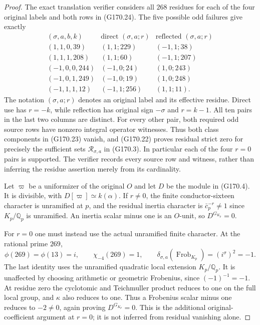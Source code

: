 \begin{proof}
The exact translation verifier considers all $268$ residues
for each of the four original labels and both rows in
(G170.24).  The five possible odd failures give exactly
\[
 \begin{array}{c|c|c}
 (\sigma,a,b,k)&\text{direct }(\sigma,a;r)&\text{reflected }(\sigma,a;r)\\ \hline
 (1,1,0,39)&(1,1;229)&(-1,1;38)\\
 (1,1,1,208)&(1,1;60)&(-1,1;207)\\
 (-1,0,0,244)&(-1,0;24)&(1,0;243)\\
 (-1,0,1,249)&(-1,0;19)&(1,0;248)\\
 (-1,1,1,12)&(-1,1;256)&(1,1;11).
 \end{array}
 \tag{G170.25}
\]
The notation $(\sigma,a;r)$ denotes an original label and
its effective residue.  Direct use has $r=-k$, while reflection
has original sign $-\sigma$ and $r=k-1$.
All ten pairs in the last two columns are distinct.
For every other pair, both required odd source rows have
nonzero integral operator witnesses.  Thus both class
components in (G170.23) vanish, and (G170.22) proves
residual strict zero for precisely the sufficient sets
$\mathcal R_{\sigma,a}$ in (G170.3).
In particular each of the four $r=0$ pairs is supported.
The verifier records every source row and witness, rather
than inferring the residue assertion merely from its cardinality.

Let $\varpi$ be a uniformizer of the original $O$ and let $D$
be the module in (G170.4).
It is divisible, with $D[\varpi]\simeq k(\alpha)$.
If $r\ne0$, the finite conductor-sixteen character is
unramified at $p$, and the residual inertia character is
$\bar c_p^{-r}\ne1$ since $K_p/\mathbb Q_p$ is unramified.
An inertia scalar minus one is an $O$-unit, so
$D^{G_{K_p}}=0$.

For $r=0$ one must instead use the actual unramified finite
character.  At the rational prime $269$,
\[
 \phi(269)=\phi(13)=i,
 \qquad \chi_{-4}(269)=1,
 \qquad \delta_{\sigma,a}(\operatorname{Frob}_{K_p})
                         =(i^\sigma)^2=-1.
 \tag{G170.26}
\]
The last identity uses the unramified quadratic local extension
$K_p/\mathbb Q_p$.  It is unaffected by choosing arithmetic
or geometric Frobenius, since $(-1)^{-1}=-1$.
At residue zero the cyclotomic and Teichmuller product reduces
to one on the full local group, and $\kappa$ also reduces to one.
Thus a Frobenius scalar minus one reduces to $-2\ne0$,
again proving $D^{G_{K_p}}=0$.
This is the additional original-coefficient argument at $r=0$;
it is not inferred from residual vanishing alone.


\end{proof}
